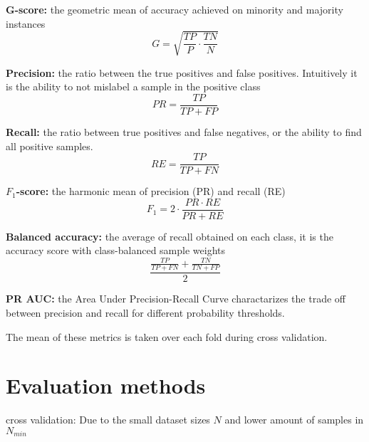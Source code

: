\textbf{G-score:} the geometric mean of accuracy achieved on minority and majority instances
\begin{equation}
    G = \sqrt{\frac{TP}{P} \cdot \frac{TN}{N}}
\end{equation}

\textbf{Precision:} the ratio between the true positives and false positives. Intuitively it is the ability to not mislabel a sample in the positive class
\begin{equation}
    PR = \frac{TP}{TP + FP}
\end{equation}

\textbf{Recall:} the ratio between true positives and false negatives, or the ability to find all positive samples.
\begin{equation}
    RE = \frac{TP}{TP + FN}
\end{equation}

\textbf{$F_1$-score:} the harmonic mean of precision (PR) and recall (RE)
\begin{equation}
    F_1 = 2 \cdot \frac{PR \cdot RE}{PR + RE}
\end{equation}

\textbf{Balanced accuracy:} the average of recall obtained on each class, it is the accuracy score with class-balanced sample weights
\begin{equation}
    \frac{\frac{TP}{TP + FN} + \frac{TN}{TN + FP}}{2}
\end{equation}

\textbf{PR AUC:} the Area Under Precision-Recall Curve charactarizes the trade off between precision and recall for different probability thresholds. 

The mean of these metrics is taken over each fold during cross validation. 

\section{Evaluation methods}
cross validation: Due to the small dataset sizes $N$ and lower amount of samples in $N_{min}$